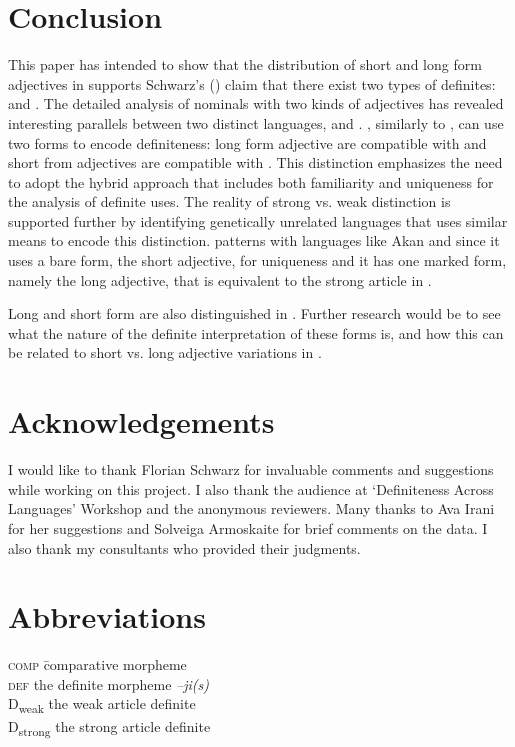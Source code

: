 \documentclass[output=paper,
modfonts
]{langscibook}
\begin{document}
\section{Conclusion} \label{sec:sereikaite:5}

This paper has intended to show that the distribution of short and long form adjectives in  supports Schwarz's (\citeyear{Schwarz2009,Schwarz2013}) claim that there exist two types of definites:  and . The detailed analysis of nominals with two kinds of adjectives has revealed interesting parallels between two distinct languages,  and . , similarly to , can use two forms to encode definiteness: long form adjective are compatible with  and short from adjectives are compatible with . This distinction emphasizes the need to adopt the hybrid approach that includes both familiarity and uniqueness for the analysis of definite uses. The reality of strong vs. weak distinction is supported further by identifying genetically unrelated languages that uses similar means to encode this distinction.  patterns with languages like Akan and  since it uses a bare form, the short adjective, for uniqueness and it has one marked form, namely the long adjective, that is equivalent to the strong article in . 

Long and short form  are also distinguished in . Further research would be to see what the nature of the definite interpretation of these forms is, and how this can be related to short vs. long adjective variations in .

\section*{Acknowledgements}
I would like to thank Florian Schwarz for invaluable comments  and suggestions while working on this project. I also thank the audience at `Definiteness Across Languages' Workshop and the anonymous reviewers. Many thanks to Ava Irani for her suggestions and Solveiga Armoskaite for brief comments on the data. I also thank my consultants who provided their judgments. 

\section*{Abbreviations}
\begin{tabbing}
	\textsc{comp}\hspace{1em} \= comparative morpheme\\ \kill 
	\textsc{def} \> the definite morpheme \textit{–ji(s)} \\
	D\textsubscript{weak} \> the weak article definite\\
	D\textsubscript{strong} \> the strong article definite \\
\end{tabbing}

{\sloppy
\printbibliography[heading=subbibliography,notkeyword=this]}
\end{document}
